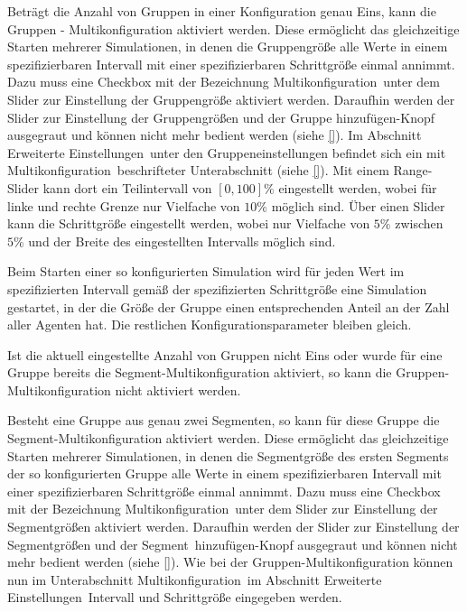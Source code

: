 \documentclass[parskip=full,11pt,twoside]{scrartcl}
\def\segment{Segment}
\def\segments{Segmente}
\begin{document}
Beträgt die Anzahl von Gruppen in einer Konfiguration genau Eins, kann die Gruppen - Multikonfiguration aktiviert werden. Diese ermöglicht das gleichzeitige Starten mehrerer Simulationen, in denen die Gruppengröße alle Werte in einem spezifizierbaren Intervall mit einer spezifizierbaren Schrittgröße einmal annimmt. Dazu muss eine Checkbox mit der Bezeichnung \glqq Multikonfiguration\grqq\ unter dem Slider zur Einstellung der Gruppengröße aktiviert werden. Daraufhin werden der Slider zur Einstellung der Gruppengrößen und der \glqq Gruppe hinzufügen\grqq -Knopf ausgegraut und können nicht mehr bedient werden (siehe \cref{}). Im Abschnitt \glqq Erweiterte Einstellungen\grqq\ unter den Gruppeneinstellungen befindet sich ein mit \glqq Multikonfiguration\grqq\ beschrifteter Unterabschnitt (siehe \cref{}). Mit einem Range-Slider kann dort ein Teilintervall von \([0,100]\%\) eingestellt werden, wobei für linke und rechte Grenze nur Vielfache von \(10\%\) möglich sind. Über einen Slider kann die Schrittgröße eingestellt werden, wobei nur Vielfache von \(5\%\) zwischen \(5\%\) und der Breite des eingestellten Intervalls möglich sind.

Beim Starten einer so konfigurierten Simulation wird für jeden Wert im spezifizierten Intervall gemäß der spezifizierten Schrittgröße eine Simulation gestartet, in der die Größe der Gruppe einen entsprechenden Anteil an der Zahl aller Agenten hat. Die restlichen Konfigurationsparameter bleiben gleich.

Ist die aktuell eingestellte Anzahl von Gruppen nicht Eins oder wurde für eine Gruppe bereits die \segment -Multikonfiguration aktiviert, so kann die Gruppen-Multikonfiguration nicht aktiviert werden.

\functionality{Multikonfiguration von \segments n}{fnc:multikonfseg}
Besteht eine Gruppe aus genau zwei \segments n, so kann für diese Gruppe die \segment -Multikonfiguration aktiviert werden. Diese ermöglicht das gleichzeitige Starten mehrerer Simulationen, in denen die \segment größe des ersten \segment s der so konfigurierten Gruppe alle Werte in einem spezifizierbaren Intervall mit einer spezifizierbaren Schrittgröße einmal annimmt. Dazu muss eine Checkbox mit der Bezeichnung \glqq Multikonfiguration\grqq\ unter dem Slider zur Einstellung der \segment größen aktiviert werden. Daraufhin werden der Slider zur Einstellung der \segment größen und der \glqq \segment\ hinzufügen\grqq -Knopf ausgegraut und können nicht mehr bedient werden (siehe \cref{}). Wie bei der Gruppen-Multikonfiguration können nun im Unterabschnitt \glqq Multikonfiguration\grqq\ im Abschnitt \glqq Erweiterte Einstellungen\grqq\ Intervall und Schrittgröße eingegeben werden.
\end{document}
